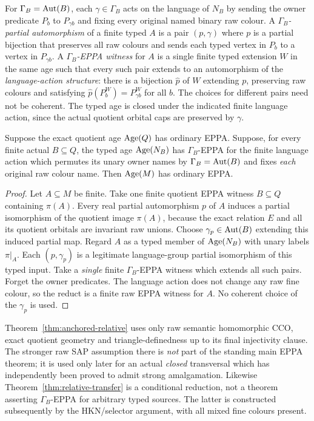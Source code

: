 \begin{definition}
\label{def:gamma-eppa}
For $\Gamma_B=\operatorname{Aut}(B)$, each $\gamma\in\Gamma_B$ acts on the
language of $N_B$ by sending the owner predicate $P_b$ to
$P_{\gamma b}$ and fixing every original named binary raw colour.
A \emph{$\Gamma_B$-partial automorphism} of a finite typed $A$
is a pair $(p,\gamma)$ where $p$ is a partial bijection that
preserves all raw colours and sends each typed vertex in $P_b$
to a vertex in $P_{\gamma b}$.  A \emph{$\Gamma_B$-EPPA witness}
for $A$ is a single finite typed extension $W$ in the same age
such that every such pair extends to an automorphism of the
\emph{language-action structure}: there is a bijection $\widehat p$
of $W$ extending $p$, preserving raw colours and satisfying
$\widehat p(P_b^W)=P_{\gamma b}^W$ for all $b$.  The choices
for different pairs need not be coherent.  The typed age is closed
under the indicated finite language action, since the
actual quotient orbital caps are preserved by $\gamma$.
\end{definition}

\begin{theorem}
\label{thm:relative-transfer}
Suppose the exact quotient age $\operatorname{Age}(Q)$ has ordinary EPPA.
Suppose, for every finite actual $B\subseteq Q$, the typed age
$\operatorname{Age}(N_B)$ has $\Gamma_B$-EPPA for the finite language action
which permutes its unary owner names by $\Gamma_B=\operatorname{Aut}(B)$
and fixes \emph{each} original raw colour name.  Then
$\operatorname{Age}(M)$ has ordinary EPPA.
\end{theorem}
\begin{proof}
Let $A\subseteq M$ be finite.  Take one finite quotient EPPA
witness $B\subseteq Q$ containing $\pi(A)$.  Every real partial
automorphism $p$ of $A$ induces a partial isomorphism of the
quotient image $\pi(A)$, because the exact relation $E$ and all
its quotient orbitals are invariant raw unions.  Choose
$\gamma_p\in\operatorname{Aut}(B)$ extending this induced partial map.
Regard $A$ as a typed member of $\operatorname{Age}(N_B)$ with unary labels
$\pi|_A$.  Each $(p,\gamma_p)$ is a legitimate language-group
partial isomorphism of this typed input.  Take a \emph{single}
finite $\Gamma_B$-EPPA witness which extends all such pairs.
Forget the owner predicates.  The language action does not change
any raw fine colour, so the reduct is a finite raw EPPA witness
for $A$.  No coherent choice of the $\gamma_p$ is used.
\end{proof}

\begin{remark}[Scope]
\label{rem:relative-scope}
Theorem~\ref{thm:anchored-relative} uses only raw semantic
homomorphic CCO, exact quotient geometry and triangle-definedness
up to its final injectivity clause.  The stronger raw SAP assumption
there is \emph{not} part of the standing main EPPA theorem; it is
used only later for an actual \emph{closed} transversal which has
independently been proved to admit strong amalgamation.  Likewise
Theorem~\ref{thm:relative-transfer} is a conditional reduction, not
a theorem asserting $\Gamma_B$-EPPA for arbitrary typed sources.
The latter is constructed subsequently by the HKN/selector
argument, with all mixed fine colours present.
\end{remark}
